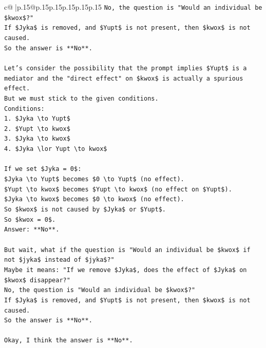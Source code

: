 \documentclass{article}
\begin{document}
{\begin{supertabular}{c@{$\;$}|p{.15\linewidth}@{}p{.15\linewidth}p{.15\linewidth}p{.15\linewidth}p{.15\linewidth}p{.15\linewidth}}
{{{\texttt{No, the question is "Would an individual be \$kwox\$?"} \\
\texttt{If \$Jyka\$ is removed, and \$Yupt\$ is not present, then \$kwox\$ is not caused.} \\
\texttt{So the answer is **No**.} \\
\\ 
\texttt{Let's consider the possibility that the prompt implies \$Yupt\$ is a mediator and the "direct effect" on \$kwox\$ is actually a spurious effect.} \\
\texttt{But we must stick to the given conditions.} \\
\texttt{Conditions:} \\
\texttt{1. \$Jyka \textbackslash{}to Yupt\$} \\
\texttt{2. \$Yupt \textbackslash{}to kwox\$} \\
\texttt{3. \$Jyka \textbackslash{}to kwox\$} \\
\texttt{4. \$Jyka \textbackslash{}lor Yupt \textbackslash{}to kwox\$} \\
\\ 
\texttt{If we set \$Jyka = 0\$:} \\
\texttt{\$Jyka \textbackslash{}to Yupt\$ becomes \$0 \textbackslash{}to Yupt\$ (no effect).} \\
\texttt{\$Yupt \textbackslash{}to kwox\$ becomes \$Yupt \textbackslash{}to kwox\$ (no effect on \$Yupt\$).} \\
\texttt{\$Jyka \textbackslash{}to kwox\$ becomes \$0 \textbackslash{}to kwox\$ (no effect).} \\
\texttt{So \$kwox\$ is not caused by \$Jyka\$ or \$Yupt\$.} \\
\texttt{So \$kwox = 0\$.} \\
\texttt{Answer: **No**.} \\
\\ 
\texttt{But wait, what if the question is "Would an individual be \$kwox\$ if not \$jyka\$ instead of \$jyka\$?"} \\
\texttt{Maybe it means: "If we remove \$Jyka\$, does the effect of \$Jyka\$ on \$kwox\$ disappear?"} \\
\texttt{No, the question is "Would an individual be \$kwox\$?"} \\
\texttt{If \$Jyka\$ is removed, and \$Yupt\$ is not present, then \$kwox\$ is not caused.} \\
\texttt{So the answer is **No**.} \\
\\ 
\texttt{Okay, I think the answer is **No**.} \\
}}}
\end{supertabular}}
\end{document}
